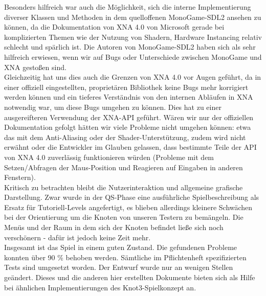 Besonders hilfreich war auch die Möglichkeit, sich die interne Implementierung diverser Klassen und Methoden in dem quelloffenen MonoGame-SDL2 ansehen zu können, da die Dokumentation von XNA 4.0 von Microsoft gerade bei komplizierten Themen wie der Nutzung von Shadern, Hardware Instancing relativ schlecht und spärlich ist. Die Autoren von MonoGame-SDL2 haben sich als sehr hilfreich erwiesen, wenn wir auf Bugs oder Unterschiede zwischen MonoGame und XNA gestoßen sind.\\

Gleichzeitig hat uns dies auch die Grenzen von XNA 4.0 vor Augen geführt, da in einer offiziell eingestellten, proprietären Bibliothek keine Bugs mehr korrigiert werden können und ein tieferes Verständnis von den internen Abläufen in XNA notwendig war, um diese Bugs umgehen zu können. Dies hat zu einer ausgereifteren Verwendung der XNA-API geführt. Wären wir nur der offiziellen Dokumentation gefolgt hätten wir viele Probleme nicht umgehen können: etwa das mit dem Anti-Aliasing oder der Shader-Unterstützung, zudem wird nicht erwähnt oder die Entwickler im Glauben gelassen, dass bestimmte Teile der API von XNA 4.0 zuverlässig funktionieren würden (Probleme mit dem Setzen/Abfragen der Maus-Position und Reagieren auf Eingaben in anderen Fenstern).\\

Kritisch zu betrachten bleibt die Nutzerinteraktion und allgemeine grafische Darstellung. Zwar wurde in der QS-Phase eine ausführliche Spielbeschreibung als Ersatz für Tutoriell-Levels angefertigt, es blieben allerdings kleinere Schwächen bei der Orientierung um die Knoten von unseren Testern zu bemängeln. Die Menüs und der Raum in dem sich der Knoten befindet ließe sich noch verschönern - dafür ist jedoch keine Zeit mehr.\\

Insgesamt ist das Spiel in einem guten Zustand. Die gefundenen Probleme konnten über 90 \% behoben werden. Sämtliche im Pflichtenheft spezifizierten Tests sind umgesetzt worden. Der Entwurf wurde nur an wenigen Stellen geändert. Dieses und die anderen hier erstellten Dokumente bieten sich als Hilfe bei ähnlichen Implementierungen des Knot3-Spielkonzept an.\\





